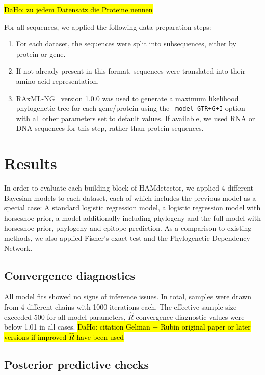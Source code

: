 \documentclass{bioinfo}
\begin{document}
\begin{methods}
\hl{DaHo: zu jedem Datensatz die Proteine nennen}

For all sequences, we applied the following data preparation steps:

\begin{enumerate}
  \item For each dataset, the sequences were split into subsequences, either by protein or gene.
  \item If not already present in this format, sequences were translated into their amino acid representation.
  \item RAxML-NG~\citep{Kozlov2019} version 1.0.0 was used to generate a maximum likelihood phylogenetic tree for each gene/protein using the \texttt{--model GTR+G+I} option with all other parameters set to default values. If available, we used RNA or DNA sequences for this step, rather than protein sequences.
\end{enumerate}

\end{methods}

\section{Results} \label{sec:results}

In order to evaluate each building block of HAMdetector, we applied 4 different Bayesian models to each dataset, each of which includes the previous model as a special case:
A standard logistic regression model, a logistic regression model with horseshoe prior, a model additionally including phylogeny and the full model with horseshoe prior, phylogeny and epitope prediction.
As a comparison to existing methods, we also applied Fisher's exact test and the Phylogenetic Dependency Network.

\subsection*{Convergence diagnostics}

 All model fits showed no signs of inference issues. In total, samples were drawn from 4 different chains with 1000 iterations each. The effective sample size exceeded 500 for all model parameters, \(\hat{R}\) convergence diagnostic values were below 1.01 in all cases. \hl{DaHo: citation Gelman + Rubin original paper or later versions if improved $\hat{R}$ have been used}

\subsection*{Posterior predictive checks}
\end{document}
